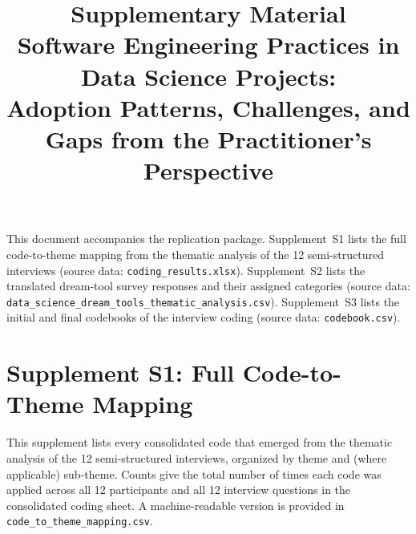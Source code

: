 \documentclass[11pt]{article}
\title{Supplementary Material\\[4pt]
\large Software Engineering Practices in Data Science Projects:\\
Adoption Patterns, Challenges, and Gaps from the Practitioner's Perspective}
\author{}
\date{}
\begin{document}
\maketitle

\noindent This document accompanies the replication package. Supplement~S1
lists the full code-to-theme mapping from the thematic analysis of
the 12 semi-structured interviews (source data: \texttt{coding\_results.xlsx}).
Supplement~S2 lists the translated dream-tool survey responses and their
assigned categories (source data:
\texttt{data\_science\_dream\_tools\_thematic\_analysis.csv}).
Supplement~S3 lists the initial and final codebooks of the interview coding
(source data: \texttt{codebook.csv}).

\section*{Supplement S1: Full Code-to-Theme Mapping}
\label{sec:supp_codes}

This supplement lists every consolidated code that emerged from the thematic analysis of the 12 semi-structured interviews, organized by theme and (where applicable) sub-theme. Counts give the total number of times each code was applied across all 12 participants and all 12 interview questions in the consolidated coding sheet. A machine-readable version is provided in \texttt{code\_to\_theme\_mapping.csv}.
\end{document}
